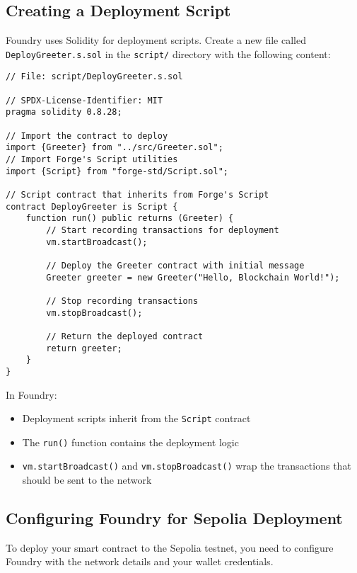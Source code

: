 \documentclass[12pt]{article}
\begin{document}
\subsection{Creating a Deployment Script}

Foundry uses Solidity for deployment scripts. Create a new file called \texttt{DeployGreeter.s.sol} in the \texttt{script/} directory with the following content:

\begin{lstlisting}[language=Solidity]
// File: script/DeployGreeter.s.sol

// SPDX-License-Identifier: MIT
pragma solidity 0.8.28;

// Import the contract to deploy
import {Greeter} from "../src/Greeter.sol";
// Import Forge's Script utilities
import {Script} from "forge-std/Script.sol";

// Script contract that inherits from Forge's Script
contract DeployGreeter is Script {
    function run() public returns (Greeter) {
        // Start recording transactions for deployment
        vm.startBroadcast();
        
        // Deploy the Greeter contract with initial message
        Greeter greeter = new Greeter("Hello, Blockchain World!");
        
        // Stop recording transactions
        vm.stopBroadcast();
        
        // Return the deployed contract
        return greeter;
    }
}
\end{lstlisting}

In Foundry:
\begin{itemize}
    \item Deployment scripts inherit from the \texttt{Script} contract
    \item The \texttt{run()} function contains the deployment logic
    \item \texttt{vm.startBroadcast()} and \texttt{vm.stopBroadcast()} wrap the transactions that should be sent to the network
\end{itemize}

\subsection{Configuring Foundry for Sepolia Deployment}

To deploy your smart contract to the Sepolia testnet, you need to configure Foundry with the network details and your wallet credentials.
\end{document}
